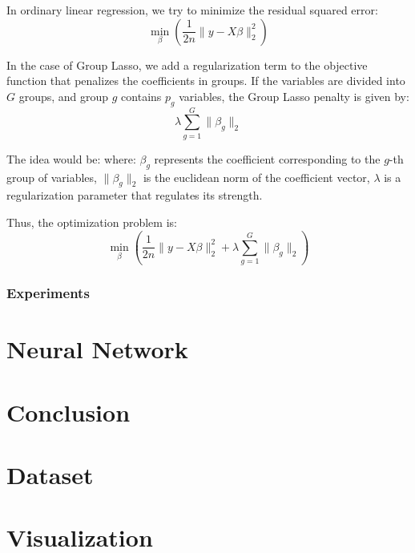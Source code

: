\documentclass[a4paper, 8pt]{article}
\begin{document}
\begin{multicols}{2}
In ordinary linear regression, we try to minimize the residual squared error:
\begin{equation}
\min_{\beta}\left (\frac{1}{2n}\lVert y-X\beta\rVert^{2}_{2} \right)
\end{equation}

In the case of Group Lasso, we add a regularization term to the objective function that penalizes the coefficients in groups. If the variables are divided into $G$ groups, and group $g$ contains $p_{g}$ variables, the Group Lasso penalty is given by:
\begin{equation}
\lambda \sum_{g=1}^{G}\lVert \beta_{g} \rVert_{2}
\end{equation}

The idea would be: where: $\beta_g$ represents the coefficient corresponding to the $g$-th group of variables, $\lVert \beta_g \rVert_2$ is the euclidean norm of the coefficient vector, $\lambda$ is a regularization parameter that regulates its strength.

Thus, the optimization problem is:
\begin{equation}
\min_{\beta}\left (\frac{1}{2n}\lVert y-X\beta\rVert^{2}_{2} + \lambda \sum_{g=1}^{G}\lVert \beta_{g} \rVert_{2}\right)
\end{equation}

\subsubsection{Experiments}


\section{Neural Network}

\section{Conclusion}
\noindent

\end{multicols}


\pagebreak
\appendix

\section{Dataset}



\section{Visualization}
\end{document}
